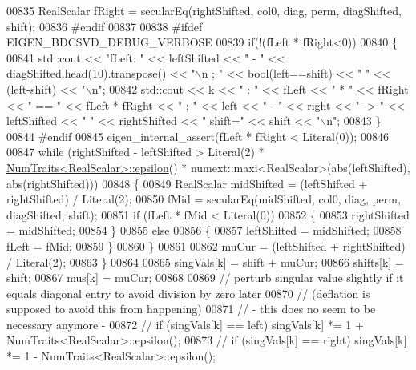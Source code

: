 \begin{DoxyCode}
00835       RealScalar fRight = secularEq(rightShifted, col0, diag, perm, diagShifted, shift);
00836 \textcolor{preprocessor}{#endif}
00837 
00838 \textcolor{preprocessor}{#ifdef  EIGEN\_BDCSVD\_DEBUG\_VERBOSE}
00839       \textcolor{keywordflow}{if}(!(fLeft * fRight<0))
00840       \{
00841         std::cout << \textcolor{stringliteral}{"fLeft: "} << leftShifted << \textcolor{stringliteral}{" - "} << diagShifted.head(10).transpose()  << \textcolor{stringliteral}{"\(\backslash\)n ; "} << 
      bool(left==shift) << \textcolor{stringliteral}{" "} << (left-shift) << \textcolor{stringliteral}{"\(\backslash\)n"};
00842         std::cout << k << \textcolor{stringliteral}{" : "} <<  fLeft << \textcolor{stringliteral}{" * "} << fRight << \textcolor{stringliteral}{" == "} << fLeft * fRight << \textcolor{stringliteral}{"  ;  "} << left
       << \textcolor{stringliteral}{" - "} << right << \textcolor{stringliteral}{" -> "} <<  leftShifted << \textcolor{stringliteral}{" "} << rightShifted << \textcolor{stringliteral}{"   shift="} << shift << \textcolor{stringliteral}{"\(\backslash\)n"};
00843       \}
00844 \textcolor{preprocessor}{#endif}
00845       eigen\_internal\_assert(fLeft * fRight < Literal(0));
00846       
00847       \textcolor{keywordflow}{while} (rightShifted - leftShifted > Literal(2) * 
      \hyperlink{group___core___module_struct_eigen_1_1_num_traits}{NumTraits<RealScalar>::epsilon}() * numext::maxi<RealScalar>(abs(leftShifted),
       abs(rightShifted)))
00848       \{
00849         RealScalar midShifted = (leftShifted + rightShifted) / Literal(2);
00850         fMid = secularEq(midShifted, col0, diag, perm, diagShifted, shift);
00851         \textcolor{keywordflow}{if} (fLeft * fMid < Literal(0))
00852         \{
00853           rightShifted = midShifted;
00854         \}
00855         \textcolor{keywordflow}{else}
00856         \{
00857           leftShifted = midShifted;
00858           fLeft = fMid;
00859         \}
00860       \}
00861 
00862       muCur = (leftShifted + rightShifted) / Literal(2);
00863     \}
00864       
00865     singVals[k] = shift + muCur;
00866     shifts[k] = shift;
00867     mus[k] = muCur;
00868 
00869     \textcolor{comment}{// perturb singular value slightly if it equals diagonal entry to avoid division by zero later}
00870     \textcolor{comment}{// (deflation is supposed to avoid this from happening)}
00871     \textcolor{comment}{// - this does no seem to be necessary anymore -}
00872 \textcolor{comment}{//     if (singVals[k] == left) singVals[k] *= 1 + NumTraits<RealScalar>::epsilon();}
00873 \textcolor{comment}{//     if (singVals[k] == right) singVals[k] *= 1 - NumTraits<RealScalar>::epsilon();}

\end{DoxyCode}
